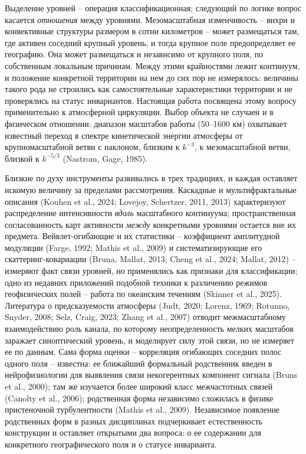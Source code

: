 \documentclass[12pt,a4paper]{article}
\begin{document}
Выделение уровней -- операция классификационная; следующий по логике вопрос касается \emph{отношения} между уровнями. Мезомасштабная изменчивость -- вихри и конвективные структуры размером в сотни километров -- может размещаться там, где активен соседний крупный уровень, и тогда крупное поле предопределяет ее географию. Она может размещаться и независимо от крупного поля, по собственным локальным причинам. Между этими крайностями лежит континуум, и положение конкретной территории на нем до сих пор не измерялось: величины такого рода не строились как самостоятельные характеристики территории и не проверялись на статус инвариантов. Настоящая работа посвящена этому вопросу применительно к атмосферной циркуляции. Выбор объекта не случаен и в физическом отношении: диапазон масштабов работы (50--1600 км) охватывает известный переход в спектре кинетической энергии атмосферы от крупномасштабной ветви с наклоном, близким к $k^{-3}$, к мезомасштабной ветви, близкой к $k^{-5/3}$ (Nastrom, Gage, 1985).

Близкие по духу инструменты развивались в трех традициях, и каждая оставляет искомую величину за пределами рассмотрения. Каскадные и мультифрактальные описания (Kouhen et al., 2024; Lovejoy, Schertzer, 2011, 2013) характеризуют распределение интенсивности \emph{вдоль} масштабного континуума; пространственная согласованность карт активности \emph{между} конкретными уровнями остается вне их предмета. Вейвлет-огибающие и их статистики -- коэффициент амплитудной модуляции (Farge, 1992; Mathis et al., 2009) и систематизирующие его скаттеринг-ковариации (Bruna, Mallat, 2013; Cheng et al., 2024; Mallat, 2012) -- измеряют факт связи уровней, но применялись как признаки для классификации; одно из недавних приложений подобной техники к различению режимов геофизических полей -- работа по океанским течениям (Skinner et al., 2025). Литература о предсказуемости атмосферы (Judt, 2020; Lorenz, 1969; Rotunno, Snyder, 2008; Selz, Craig, 2023; Zhang et al., 2007) отводит межмасштабному взаимодействию роль канала, по которому неопределенность мелких масштабов заражает синоптический уровень, и моделирует силу этой связи, но не измеряет ее по данным. Сама форма оценки -- корреляция огибающих соседних полос одного поля -- известна: ее ближайший формальный родственник введен в нейрофизиологии для выявления связи некогерентных компонент сигнала (Bruns et al., 2000); там же изучается более широкий класс межчастотных связей (Canolty et al., 2006); родственная форма независимо сложилась в физике пристеночной турбулентности (Mathis et al., 2009). Независимое появление родственных форм в разных дисциплинах подчеркивает естественность конструкции и оставляет открытыми два вопроса: о ее содержании для конкретного географического поля и о статусе инварианта.
\end{document}
